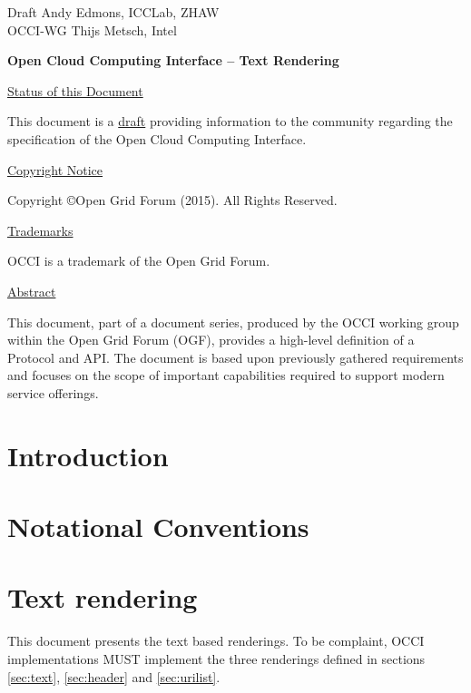 \documentclass[10pt,a4paper]{article}
\begin{document}
\thispagestyle{empty}

Draft \hfill Andy Edmons, ICCLab, ZHAW \\
OCCI-WG \hfill Thijs Metsch, Intel\\
\rightline {\today}

\vspace*{0.5in}

\begin{Large}
\textbf{Open Cloud Computing Interface -- Text Rendering}
\end{Large}

\vspace*{0.5in}

\underline{Status of this Document}

This document is a \underline{draft} providing information to the community regarding the specification of the Open Cloud Computing Interface.

\underline{Copyright Notice}

Copyright \copyright Open Grid Forum (2015). All Rights Reserved.

\underline{Trademarks}

OCCI is a trademark of the Open Grid Forum.

\underline{Abstract}

This document, part of a document series, produced by the OCCI working
group within the Open Grid Forum (OGF), provides a high-level
definition of a Protocol and API. The document is based upon
previously gathered requirements and focuses on the scope of important
capabilities required to support modern service offerings.

\newpage
\tableofcontents
\newpage

\section{Introduction}


\section{Notational Conventions}


\section{Text rendering}

This document presents the text based renderings. To be complaint, OCCI implementations MUST implement the three renderings defined in sections \ref{sec:text}, \ref{sec:header} and \ref{sec:urilist}.
\end{document}
